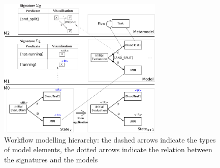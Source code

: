 \documentclass[a4paper]{llncs}
\begin{document}
\begin{figure}
  \begin{center}
    \includegraphics[width=0.7\textwidth]{ex_form_workflow_hierarchy}
  \end{center}
  \vspace{-4mm}
  \caption{Workflow modelling hierarchy: the dashed arrows indicate the types of model elements, the dotted arrows indicate the relation between the signatures and the models}
  \label{fig:ex_form_workflow_hierarchy}
  \vspace{-4mm}
\end{figure}
\end{document}

